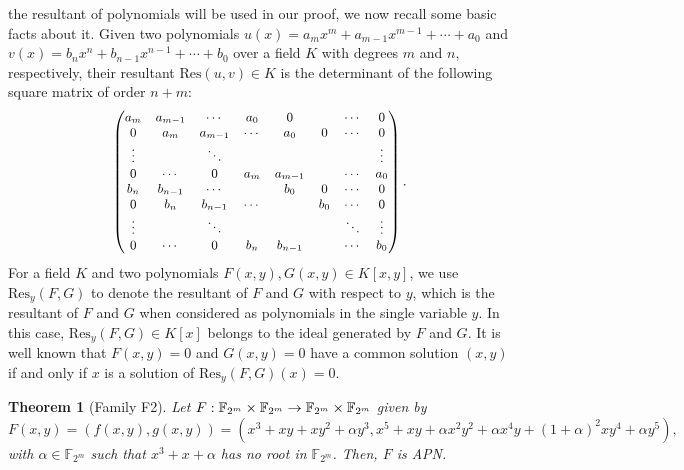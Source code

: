 \documentclass{article}
\newtheorem{theorem}{Theorem}
\newcommand{\mkq}[1]{{{\color{black}#1}}}
\begin{document}
\mkq{{Since} the resultant of polynomials will be used in our proof, we now recall some basic facts about it. Given two polynomials $ u(x) = a_mx^m+a_{m-1}x^{m-1}+\cdots+a_0$ and $ v(x) = b_nx^n+b_{n-1}x^{n-1}+\cdots+b_0 $ 
over a {field} $K$ with degrees $m$ and $n$, respectively, their resultant $\mathrm{Res}(u,v)\in {K}$ is the determinant of the following square matrix of order $n+m$:
$$ \small \begin{pmatrix} 
	a_m & a_{m-1} &  \cdots & a_0  & 0 & & \cdots & 0 \\
	0 & a_m & a_{m-1} & \cdots & a_0 & 0 & \cdots  & 0 \\
	\vdots &  &  \ddots&  &  &  & & \vdots  \\
	0 & \cdots & 0 & a_m & a_{m-1} &  & \cdots & a_0 \\
	b_n & b_{n-1} & \cdots &  & b_0 & 0 &\cdots  & 0\\
	0 & b_{n} & b_{n-1} & \cdots &  & b_0 & \cdots  & 0\\
	\vdots &  & \ddots &  & &   &  \ddots &   \vdots   \\ 
	0   & \cdots & 0 & b_{n} & b_{n-1}&  &   \cdots &  b_0    \\
\end{pmatrix}.
$$
For a field $K$ and two polynomials $F(x,y), G(x,y) \in K[x,y]$, we use $ \mathrm{Res}_y(F,G)$ to denote the resultant  of $F$ and $G$ with respect to $y$, { which is the resultant of $F$ and $G$ when considered as  polynomials in the single variable $y$.} In this case, $ \mathrm{Res}_y(F,G)\in K[x]$ belongs to the ideal generated by $F$ and $G$. {It is well known that $F(x,y)=0$ and $G(x,y)=0$ have a common solution $(x, y)$ if and only if
	$x$ is a solution of $\mathrm{Res}_y(F,G)(x)=0$. }}




\begin{theorem}[Family F2]\label{th:main2}
Let $F:{\Bbb F}_{2^m}\times{\Bbb F}_{2^m}\rightarrow{\Bbb F}_{2^m}\times{\Bbb F}_{2^m}$ given by
$$F(x,y)=(f(x,y),g(x,y))=(x^{3}+xy+xy^2+\alpha y^{3}, x^{5}+xy+\alpha x^2y^2+\alpha x^{4}y+(1+\alpha)^2 xy^{4}+\alpha y^{5}),$$
with $\alpha\in\mathbb{F}_{2^m}$ such that $ x^{3}+x+\alpha$ has no root in $\mathbb{F}_{2^m}$. Then, $F$ is APN.
\end{theorem}
\end{document}
